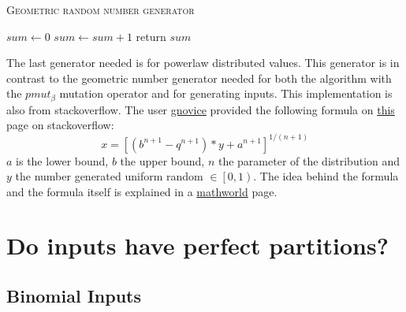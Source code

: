 \begin{algorithm}[h]
      \caption{\textsc{Geometric random number generator}}\label{alg:geometricRNG}

      \DontPrintSemicolon %
      $sum \leftarrow 0$\; \tcp{random() generates a random value $\in \left[0, 1\right)$}
      {
            $sum \leftarrow sum+1$\;
      }
      return $sum$\;
\end{algorithm}

The last generator needed is for powerlaw distributed values.
This generator is in contrast to the geometric number generator needed for both the algorithm with the $pmut_\beta$ mutation operator and for generating inputs.
This implementation is also from stackoverflow. The user \href{https://stackoverflow.com/users/52738/gnovice}{gnovice} provided the following formula on \href{https://stackoverflow.com/questions/918736/random-number-generator-that-produces-a-power-law-distribution}{this} page on stackoverflow:
\[
      x = {[(b^{n+1} - q^{n+1})*y + a^{n+1}]}^{1/(n+1)}
\]
$a$ is the lower bound, $b$ the upper bound, $n$ the parameter of the distribution and $y$ the number generated uniform random $\in \left[0, 1\right)$.
The idea behind the formula and the formula itself is explained in a \href{https://mathworld.wolfram.com/RandomNumber.html}{mathworld} page.


\section{Do inputs have perfect partitions?}
\subsection{Binomial Inputs}

